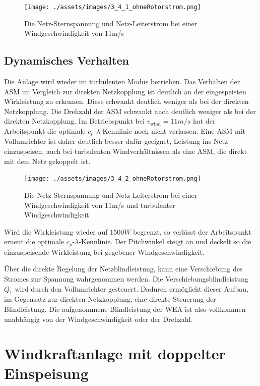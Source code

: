 \documentclass{report}
\begin{document}
\begin{figure}[!ht]
	\centering
	\texttt{[image: ./assets/images/3\_4\_1\_ohneRotorstrom.png]}
	\caption{Die Netz-Sternspannung und Netz-Leiterstrom bei einer Windgeschwindigkeit von 11m/s}
	\label{fig:oszi_umrichter}
\end{figure}

\subsection{Dynamisches Verhalten}

Die Anlage wird wieder im turbulenten Modus betrieben. Das Verhalten der ASM im Vergleich zur direkten Netzkopplung ist deutlich an der eingespeisten Wirkleistung zu erkennen. Diese schwankt deutlich weniger als bei der direkten Netzkopplung. Die Drehzahl der ASM schwankt auch deutlich weniger als bei der direkten Netzkopplung. Im Betriebspunkt bei $v_{\mathrm{wind}} = 11m/s$ hat der Arbeitspunkt die optimale $c_{p}$-$\lambda$-Kennlinie noch nicht verlassen. Eine ASM mit Vollumrichter ist daher deutlich besser dafür geeignet, Leistung ins Netz einzuspeisen, auch bei turbulenten Windverhältnissen als eine ASM, die direkt mit dem Netz gekoppelt ist.

\begin{figure}[!ht]
	\centering
	\texttt{[image: ./assets/images/3\_4\_2\_ohneRotorstrom.png]}
	\caption{Die Netz-Sternspannung und Netz-Leiterstrom bei einer Windgeschwindigkeit von 11m/s und turbulenter Windgeschwindigkeit}
	\label{fig:oszi_umrichter_turbulent}
\end{figure}

Wird die Wirkleistung wieder auf $1500W$ begrenzt, so verlässt der Arbeitspunkt erneut die optimale $c_{p}$-$\lambda$-Kennlinie. Der Pitchwinkel steigt an und deckelt so die einzuspeisende Wirkleistung bei gegebener Windgeschwindigkeit.

Über die direkte Regelung der Netzblindleistung, kann eine Verschiebung des Stromes zur Spannung wahrgenommen werden. Die Verschiebungsblindleistung $Q_{1}$ wird durch den Vollumrichter gesteuert. Dadurch ermöglicht dieser Aufbau, im Gegensatz zur direkten Netzkopplung, eine direkte Steuerung der Blindleistung. Die aufgenommene Blindleistung der WEA ist also vollkommen unabhängig von der Windgeschwindigkeit oder der Drehzahl.

\section{Windkraftanlage mit doppelter Einspeisung}
\label{sec:windkr-mit-dopp}
\end{document}
